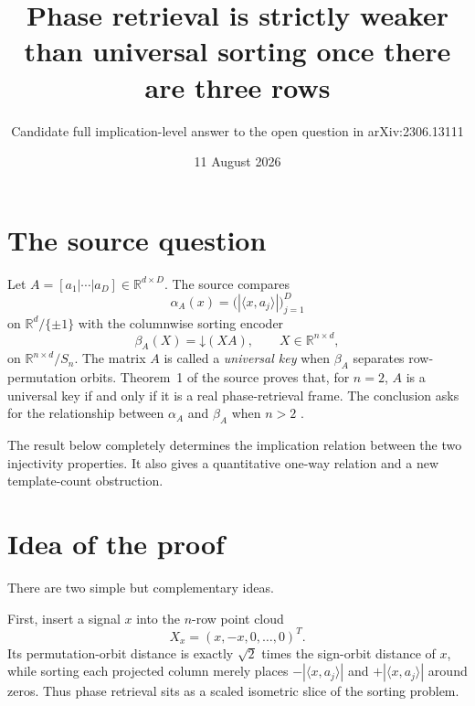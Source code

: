 \documentclass[11pt]{article}
\title{Phase retrieval is strictly weaker than universal sorting once there are three rows}
\author{Candidate full implication-level answer to the open question in arXiv:2306.13111}
\date{11 August 2026}
\newcommand{\R}{\mathbb R}
\newcommand{\Sn}{S_n}
\newcommand{\down}{\mathord{\downarrow}}
\begin{document}
\maketitle

\noindent{}

\section{\texorpdfstring{\hspace{0.35em}}{}The source question}

Let \(A=[a_1|\cdots|a_D]\in\R^{d\times D}\).  The source compares
\[
 \alpha_A(x)=\bigl(|\langle x,a_j\rangle|\bigr)_{j=1}^D
\]
on \(\R^d/\{\pm1\}\) with the columnwise sorting encoder
\[
 \beta_A(X)=\down(XA),\qquad X\in\R^{n\times d},
\]
on \(\R^{n\times d}/\Sn\).  The matrix \(A\) is called a
\emph{universal key} when \(\beta_A\) separates row-permutation orbits.
Theorem~1 of the source proves that, for \(n=2\), \(A\) is a universal key if
and only if it is a real phase-retrieval frame.  The conclusion asks for the
relationship between \(\alpha_A\) and \(\beta_A\) when \(n>2\)
\cite[Conclusion]{BT}.

The result below completely determines the implication relation between the
two injectivity properties.  It also gives a quantitative one-way relation
and a new template-count obstruction.

\section{\texorpdfstring{\hspace{0.35em}}{}Idea of the proof}

There are two simple but complementary ideas.

First, insert a signal \(x\) into the \(n\)-row point cloud
\[
 X_x=(x,-x,0,\ldots,0)^T.
\]
Its permutation-orbit distance is exactly \(\sqrt2\) times the sign-orbit
distance of \(x\), while sorting each projected column merely places
\(-|\langle x,a_j\rangle|\) and \(+|\langle x,a_j\rangle|\) around zeros.
Thus phase retrieval sits as a scaled isometric slice of the sorting problem.
\end{document}
